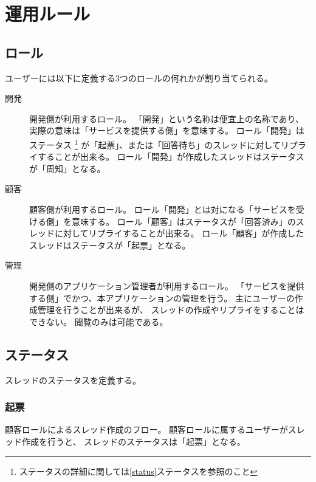 \chapter{運用ルール}
    \section{ロール}

        ユーザーには以下に定義する3つのロールの何れかが割り当てられる。

        \begin{description}
            \item[開発]
                開発側が利用するロール。
                「開発」という名称は便宜上の名称であり、
                実際の意味は「サービスを提供する側」を意味する。
                ロール「開発」はステータス
                    \footnote{ステータスの詳細に関しては\ref{status}ステータスを参照のこと}
                が「起票」、または「回答待ち」のスレッドに対してリプライすることが出来る。
                ロール「開発」が作成したスレッドはステータスが「周知」となる。

            \item[顧客]
                顧客側が利用するロール。
                ロール「開発」とは対になる「サービスを受ける側」を意味する。
                ロール「顧客」はステータスが「回答済み」のスレッドに対してリプライすることが出来る。
                ロール「顧客」が作成したスレッドはステータスが「起票」となる。

            \item[管理]
                開発側のアプリケーション管理者が利用するロール。
                「サービスを提供する側」でかつ、本アプリケーションの管理を行う。
                主にユーザーの作成管理を行うことが出来るが、
                スレッドの作成やリプライをすることはできない。
                閲覧のみは可能である。

        \end{description}

    \section{ステータス\label{status}}

        スレッドのステータスを定義する。

        \subsection{起票}
            顧客ロールによるスレッド作成のフロー。
            顧客ロールに属するユーザーがスレッド作成を行うと、
            スレッドのステータスは「起票」となる。

